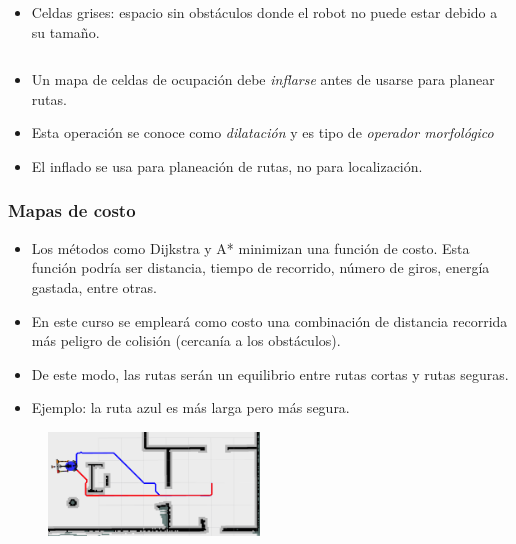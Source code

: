 \begin{frame}
\begin{columns}
\begin{column}{0.4\textwidth}
\begin{itemize}
        \item Celdas grises: espacio sin obstáculos donde el robot no puede estar debido a su tamaño. 
      \end{itemize}
    \end{column}
  \end{columns}
  \begin{itemize}
  \item Un mapa de celdas de ocupación debe \textit{inflarse} antes de usarse para planear rutas.
  \item Esta operación se conoce como \textit{dilatación} y es tipo de \textit{operador morfológico}
  \item El inflado se usa para planeación de rutas, no para localización.
  \end{itemize}
\end{frame}

\begin{frame}\frametitle{Mapas de costo}
  \begin{itemize}
  \item Los métodos como Dijkstra y A* minimizan una función de costo. Esta función podría ser distancia, tiempo de recorrido, número de giros, energía gastada, entre otras.
  \item En este curso se empleará como costo una combinación de distancia recorrida más peligro de colisión (cercanía a los obstáculos).
  \item De este modo, las rutas serán un equilibrio entre rutas cortas y rutas seguras.
  \item Ejemplo: la ruta azul es más larga pero más segura. 
  \end{itemize}
  \begin{figure}
    \centering
    \includegraphics[width=0.5\textwidth]{Figures/MotionPlanning/AStarComparison.png}
  \end{figure}
\end{frame}

